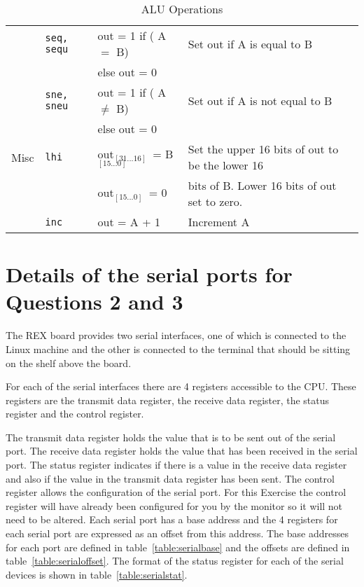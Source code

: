 \documentclass[a4paper,10pt]{article}
\begin{document}
\begin{table}[h]
\begin{center}
\begin{tabular}{|l|l|l|p{75mm}|}
\cline{2-4}
& \texttt{seq, sequ} & out = 1 if ( A $=$ B) & Set out if A
is equal to B \\
& & else out = 0 & \\
\cline{2-4}
& \texttt{sne, sneu} & out = 1 if ( A $\neq$ B) & Set out if A
is not equal to B \\
& & else out = 0 & \\
\hline
Misc & \texttt{lhi} & out\tiny$_{[31...16]}$\normalsize~= B\tiny$_{[15...0]}$ &
Set the upper 16 bits of out to be the lower 16 \\
& & out\tiny$_{[15...0]}$\normalsize~= 0 & bits of B. Lower 16 bits of out set to zero. \\ 
\cline{2-4}
& \texttt{inc} & out = A + 1 & Increment A\\
\hline
\end{tabular}
\end{center}
\caption{ALU Operations}
\label{table:alu}
\end{table}

\newpage
\section{Details of the serial ports for Questions 2 and 3}
\label{org_sp_defn}



The REX board provides two serial interfaces, one of which is
connected to the Linux machine and the other is connected to the
terminal that should be sitting on the shelf above the board. 

For each of the serial interfaces there are 4 registers accessible to
the CPU. These registers are the transmit data register, the receive
data register, the status register and the control register.

The transmit data register holds the value that is to be sent out of
the serial port. The receive data register holds the value that has
been received in the serial port. The status register indicates if
there is a value in the receive data register and also if the value in
the transmit data register has been sent. The control register allows
the configuration of the serial port. For this Exercise the control
register will have already been configured for you by the monitor so
it will not need to be altered. Each serial port has a base address
and the 4 registers for each serial port are expressed as an offset
from this address. The base addresses for each port are defined in
table~\ref{table:serialbase} and the offsets are defined in
table~\ref{table:serialoffset}. The format of the status register for
each of the serial devices is shown in table~\ref{table:serialstat}.
\end{document}
